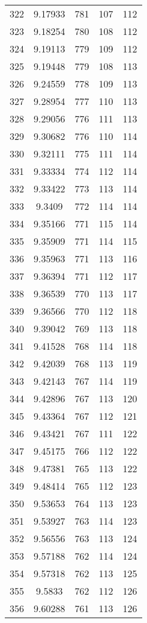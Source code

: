 \documentclass[12pt,a4paper]{article}
\begin{document}
\begin{tabular}{r|cccc}
	322 & 9.17933 & 781 & 107 & 112 \\
	323 & 9.18254 & 780 & 108 & 112 \\
	324 & 9.19113 & 779 & 109 & 112 \\
	325 & 9.19448 & 779 & 108 & 113 \\
	326 & 9.24559 & 778 & 109 & 113 \\
	327 & 9.28954 & 777 & 110 & 113 \\
	328 & 9.29056 & 776 & 111 & 113 \\
	329 & 9.30682 & 776 & 110 & 114 \\
	330 & 9.32111 & 775 & 111 & 114 \\
	331 & 9.33334 & 774 & 112 & 114 \\
	332 & 9.33422 & 773 & 113 & 114 \\
	333 & 9.3409 & 772 & 114 & 114 \\
	334 & 9.35166 & 771 & 115 & 114 \\
	335 & 9.35909 & 771 & 114 & 115 \\
	336 & 9.35963 & 771 & 113 & 116 \\
	337 & 9.36394 & 771 & 112 & 117 \\
	338 & 9.36539 & 770 & 113 & 117 \\
	339 & 9.36566 & 770 & 112 & 118 \\
	340 & 9.39042 & 769 & 113 & 118 \\
	341 & 9.41528 & 768 & 114 & 118 \\
	342 & 9.42039 & 768 & 113 & 119 \\
	343 & 9.42143 & 767 & 114 & 119 \\
	344 & 9.42896 & 767 & 113 & 120 \\
	345 & 9.43364 & 767 & 112 & 121 \\
	346 & 9.43421 & 767 & 111 & 122 \\
	347 & 9.45175 & 766 & 112 & 122 \\
	348 & 9.47381 & 765 & 113 & 122 \\
	349 & 9.48414 & 765 & 112 & 123 \\
	350 & 9.53653 & 764 & 113 & 123 \\
	351 & 9.53927 & 763 & 114 & 123 \\
	352 & 9.56556 & 763 & 113 & 124 \\
	353 & 9.57188 & 762 & 114 & 124 \\
	354 & 9.57318 & 762 & 113 & 125 \\
	355 & 9.5833 & 762 & 112 & 126 \\
	356 & 9.60288 & 761 & 113 & 126 \\

\end{tabular}
\end{document}
